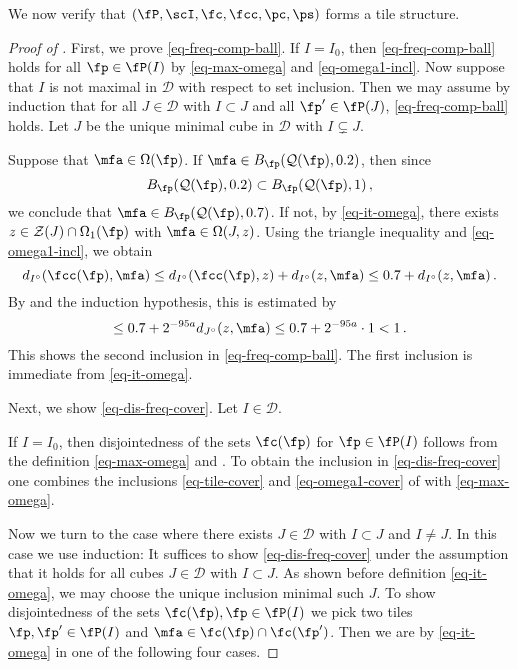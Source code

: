 We now verify that $(\fP,\scI,\fc,\fcc,\pc,\ps)$ forms a tile structure.
\begin{proof}[Proof of ]
    \leanok
    First, we prove \eqref{eq-freq-comp-ball}. If $I =I_0$, then \eqref{eq-freq-comp-ball} holds for all $\fp \in \fP(I)$ by \eqref{eq-max-omega} and \eqref{eq-omega1-incl}. Now suppose that $I$ is not maximal in $\mathcal{D}$ with respect to set inclusion. Then we may assume by induction that for all $J \in \mathcal{D}$ with $I \subset J$ and all $\fp' \in \fP(J)$, \eqref{eq-freq-comp-ball} holds. Let $J$ be the unique minimal cube in $\mathcal{D}$ with $I \subsetneq J$.

    Suppose that $\mfa \in \Omega(\fp)$. If $\mfa\in B_{\fp}(\mathcal{Q}(\fp), 0.2)$, then since
    \begin{equation*}
        B_{\fp}(\mathcal{Q}(\fp), 0.2)\subset B_{\fp}(\mathcal{Q}(\fp), 1)\, ,
    \end{equation*}
    we conclude that $\mfa\in B_{\fp}(\mathcal{Q}(\fp), 0.7)$. If not, by \eqref{eq-it-omega}, there exists $z \in \mathcal{Z}(J) \cap \Omega_1(\fp)$ with $\mfa \in \Omega(J,z)$. Using the triangle inequality and \eqref{eq-omega1-incl}, we obtain
    $$
        d_{I^\circ}(\fcc(\fp),\mfa) \le d_{I^\circ}(\fcc(\fp), z) + d_{I^\circ}(z, \mfa) \le 0.7 + d_{I^\circ}(z, \mfa)\,.
    $$
    By  and the induction hypothesis, this is estimated by
    $$
        \le 0.7 + 2^{-95a} d_{J^\circ}(z,\mfa) \le 0.7 + 2^{-95a}\cdot 1 < 1\,.
    $$
    This shows the second inclusion in \eqref{eq-freq-comp-ball}. The first inclusion is immediate from \eqref{eq-it-omega}.

    Next, we show \eqref{eq-dis-freq-cover}. Let $I \in \mathcal{D}$.

    If $I = I_0$, then disjointedness of the sets $\fc(\fp)$ for $\fp \in \fP(I)$ follows from the definition \eqref{eq-max-omega} and . To obtain the inclusion in \eqref{eq-dis-freq-cover} one combines the inclusions \eqref{eq-tile-cover} and \eqref{eq-omega1-cover}
    of  with \eqref{eq-max-omega}.

    Now we turn to the case where there exists $J \in \mathcal{D}$ with $I \subset J$ and $I\ne J$. In this case we use induction: It suffices to show \eqref{eq-dis-freq-cover} under the assumption that it holds for all cubes $J \in \mathcal{D}$ with $I \subset J$. As shown before definition \eqref{eq-it-omega}, we may choose the unique inclusion minimal such $J$. To show disjointedness of the sets $\fc(\fp), \fp \in \fP(I)$ we pick two tiles $\fp, \fp' \in \fP(I)$ and $\mfa \in \fc(\fp) \cap \fc(\fp')$.
    Then we are by \eqref{eq-it-omega} in one of the following four cases.


\end{proof}
